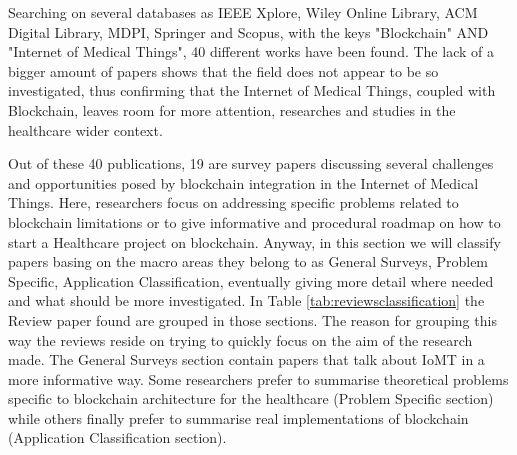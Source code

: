 \documentclass[preprint]{elsarticle}
\begin{document}
Searching on several databases as IEEE Xplore, Wiley Online Library, ACM Digital Library, MDPI, Springer and Scopus, with the keys "Blockchain" AND "Internet of Medical Things", 40 different works have been found. The lack of a bigger amount of papers shows that the field does not appear to be so investigated, thus confirming that the Internet of Medical Things, coupled with Blockchain, leaves room for more attention, researches and studies in the healthcare wider context.

Out of these 40 publications, 19 are survey papers discussing several challenges and opportunities posed by blockchain integration in the Internet of Medical Things. 
Here, researchers focus on addressing specific problems related to blockchain limitations or to give informative and procedural roadmap on how to start a Healthcare project on blockchain. Anyway, in this section we will classify papers basing on the macro areas they belong to as General Surveys, Problem Specific, Application Classification, eventually giving more detail where needed and what should be more investigated. 
In Table \ref{tab:reviewsclassification} the Review paper found are grouped in those sections. The reason for grouping this way the reviews reside on trying to quickly focus on the aim of the research made. The General Surveys section contain papers that talk about IoMT in a more informative way. Some researchers prefer to summarise theoretical problems specific to blockchain architecture for the healthcare (Problem Specific section) while others finally prefer to summarise real implementations of blockchain (Application Classification section).\\
\end{document}
